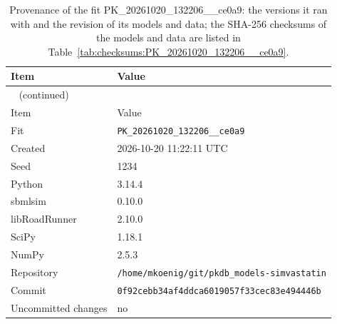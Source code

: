 \begin{longtable}{ll}
\caption{Provenance of the fit PK\_20261020\_132206\_\_ce0a9: the versions it ran with and the revision of its models and data; the SHA-256 checksums of the models and data are listed in Table~\ref{tab:checksums:PK_20261020_132206__ce0a9}.}\label{tab:provenance:PK_20261020_132206__ce0a9} \\
\toprule
Item & Value \\
\midrule
\endfirsthead
\multicolumn{2}{l}{\small\tablename~\thetable{} (continued)} \\
\toprule
Item & Value \\
\midrule
\endhead
\bottomrule
\endlastfoot
Fit & \texttt{PK\_20261020\_132206\_\_ce0a9} \\
Created & 2026-10-20 11:22:11 UTC \\
Seed & 1234 \\
Python & 3.14.4 \\
sbmlsim & 0.10.0 \\
libRoadRunner & 2.10.0 \\
SciPy & 1.18.1 \\
NumPy & 2.5.3 \\
Repository & \texttt{/home/mkoenig/git/pkdb\_models-simvastatin} \\
Commit & \texttt{0f92cebb34af4ddca6019057f33cec83e494446b} \\
Uncommitted changes & no \\
\end{longtable}



